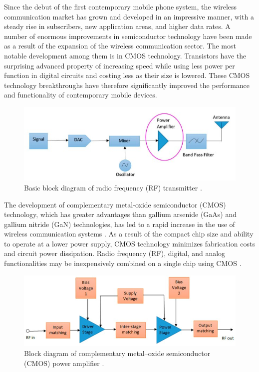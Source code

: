 Since the debut of the first contemporary mobile phone system, the wireless communication market has grown and developed in an impressive manner, with a steady rise in subscribers, new application areas, and higher data rates. A number of enormous improvements in
semiconductor technology have been made as a result of the expansion of the wireless communication sector. The most notable development among them is in CMOS technology. Transistors have the surprising advanced property of increasing speed while using less power
per function in digital circuits and costing less as their size is lowered. These CMOS technology breakthroughs have therefore significantly improved the performance and functionality of contemporary mobile devices.
\begin{figure}[h]
    \centering
    \includegraphics{figures/rf-transmitter-block-diagram.jpeg}
    \caption{Basic block diagram of radio frequency (RF) transmitter \cite{first}.}
    \label{fig:rf-transmitter-block-diagram}
\end{figure}

The development of complementary metal-oxide semiconductor (CMOS) technology, which has greater advantages than gallium arsenide (GaAs) and gallium nitride (GaN) technologies, has led to a rapid increase in the use of wireless communication systems \cite{second,third}. As a result of the compact chip size and ability to operate at a lower power supply, CMOS technology minimizes fabrication costs \cite{fourth} and circuit power dissipation. Radio frequency (RF), digital,
and analog functionalities may be inexpensively combined on a single chip using CMOS \cite{fifth}.
\begin{figure}[h]
    \centering
    \includegraphics[]{figures/cmos-power-amplifier-block-diagram.jpeg}
    \caption{Block diagram of complementary metal–oxide semiconductor (CMOS) power
amplifier \cite{sixth}.}
    \label{fig:cmos-power-block-diagram}
\end{figure}

